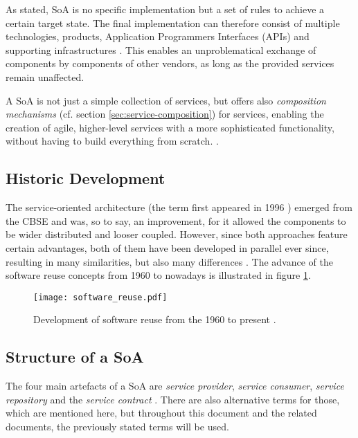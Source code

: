 As stated, SoA is no specific implementation but a set of rules to achieve a certain target state. The final implementation can therefore consist of multiple technologies, products, Application Programmers Interfaces (APIs) and supporting infrastructures \cite[p.29]{erl2011}. This enables an unproblematical exchange of components by components of other vendors, as long as the provided services remain unaffected.

A SoA is not just a simple collection of services, but offers also \emph{composition mechanisms} (cf. section \ref{sec:service-composition}) for services, enabling the creation of agile, higher-level services with a more sophisticated functionality, without having to build everything from scratch. \cite[p.12]{josuttis}.



\subsection{Historic Development}
The service-oriented architecture (the term first appeared in 1996 \cite[p.7]{rosen}) emerged from the CBSE and was, so to say, an improvement, for it allowed the components to be wider distributed and looser coupled. However, since both approaches feature certain advantages, both of them have been developed in parallel ever since, resulting in many similarities, but also many differences \cite{breivold}. The advance of the software reuse concepts from 1960 to nowadays is illustrated in figure \ref{fig:software_reuse}.



\begin{figure}[ht]
\centering
\texttt{[image: software\_reuse.pdf]}
\caption{Development of software reuse from the 1960 to present \cite{clements}.}
\label{fig:software_reuse}
\end{figure}


\subsection{Structure of a SoA}
\label{sec:structure_of_soa}
The four main artefacts of a SoA are \emph{service provider}, \emph{service consumer}, \emph{service repository} and the \emph{service contract} \cite{arrowhead} \cite{breivold} \cite{rodrigues2011}. There are also alternative terms for those, which are mentioned here, but throughout this document and the related documents, the previously stated terms will be used.

